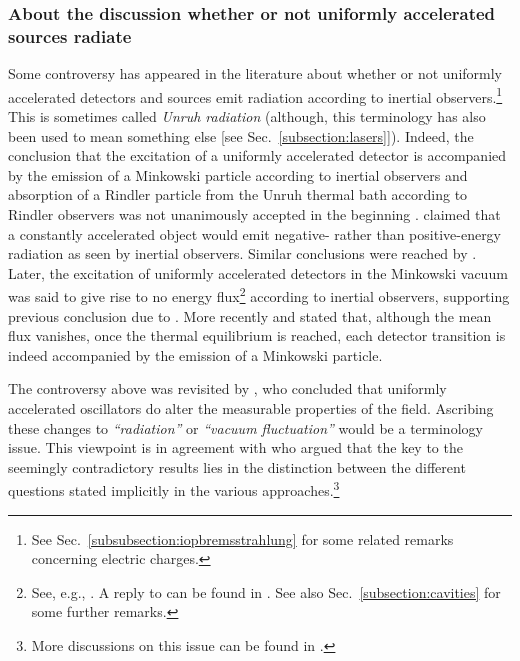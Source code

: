 \documentclass[12pt,nofootinbib,floatfix,aps,prd,showpacs,amsmath,amssymb,eqsecnum]{revtex4-2}
\let\cite\citep
\begin{document}
\subsubsection{About the discussion whether or not uniformly 
               accelerated sources radiate}
\label{subsubsection:controversy1}

Some controversy has appeared in the literature about whether or not 
uniformly accelerated detectors and sources emit radiation according to
inertial observers.\footnote{See Sec.~\ref{subsubsection:iopbremsstrahlung}
for some related remarks concerning electric charges.}
This is sometimes called {\em Unruh radiation} (although, 
this terminology has also been used to mean something else 
[see Sec.~\ref{subsection:lasers}]). Indeed, the conclusion that 
the excitation of a uniformly accelerated detector is accompanied by 
the emission of a Minkowski particle according to inertial observers and 
absorption of a Rindler particle from the Unruh thermal bath according 
to Rindler observers \cite{UnruhWald84} was not unanimously accepted 
in the beginning \cite{Padmanabhan85}. \textcite{Grove86} claimed that a 
constantly accelerated object would emit 
negative- rather than positive-energy radiation as seen by 
inertial observers. Similar conclusions were reached by 
\textcite{Massaretal93}. Later, the excitation of uniformly 
accelerated detectors in the Minkowski vacuum was said to give 
rise to no energy flux\footnote{See, e.g.,
                                \textcite{Hinterleitner93,Huetal04,Huetal04b,Fordetal06}.
                                A reply to \textcite{Huetal04} can be found in
                                \textcite{Scullyetal04}. See also
                                Sec.~\ref{subsection:cavities} for some 
                                further remarks.}
according to inertial observers, supporting previous
conclusion due to \textcite{Raineetal91}. More recently 
\textcite{Parentani95} and \textcite{Massaretal96} stated 
that, although the mean flux vanishes,
once the thermal equilibrium is reached, each 
detector transition is indeed accompanied by the emission of a 
Minkowski particle.

The controversy above was revisited by \textcite{Unruh92}, who concluded 
that uniformly accelerated oscillators do
alter the measurable properties of the field. Ascribing these changes to 
{\em ``radiation''} or {\em ``vacuum fluctuation''} would be a terminology 
issue. This viewpoint 
is in agreement with \textcite{Audretschetal94b} who argued 
that the key to the seemingly contradictory results lies in the distinction 
between the different questions stated implicitly in the various 
approaches.\footnote{More discussions on this issue can
be found in \textcite{Linetal06}.}
\end{document}
